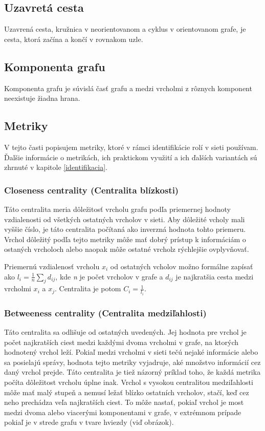 \documentclass[slovak,master,public,dept460,male,cpdeclaration,oneside]{diploma}
\begin{document}
\subsection{Uzavretá cesta}

Uzavrená cesta, kružnica v neorientovanom a cyklus v orientovanom grafe, je cesta, ktorá začína a končí v rovnakom uzle.

\subsection{Komponenta grafu}

Komponenta grafu je súvislá časť grafu a medzi vrcholmi z rôznych komponent neexistuje žiadna hrana.

\subsection{Metriky}
V tejto časti popisujem metriky, ktoré v rámci identifikácie rolí v sieti používam. Ďalšie informácie o metrikách, ich praktickom využití a ich ďalších variantách sú zhrnuté v kapitole \ref{identifikacia}.

\subsubsection{Closeness centrality (Centralita blízkosti)}
Táto centralita meria dôležitosť vrcholu grafu podľa priemernej hodnoty vzdialenosti od všetkých ostatných vrcholov v sieti. Aby dôležité vcholy mali vyššie číslo, je táto centralita počítaná ako inverzná hodnota tohto priemeru. Vrchol dôležitý podľa tejto metriky môže mať dobrý prístup k informáciám o ostaných vrcholoch alebo naopak môže ostatné vrcholz rýchlejšie ovplyvňovať.

Priemernú vzdialenosť vrcholu ${x_{i}}$ od ostatných vcholov možno formálne zapísať ako ${l_{i} = \frac{1}{n}\sum_{j}d_{ij}}$, kde \textit{n} je počet vrcholov v grafe a ${d_{ij}}$ je najkratšia cesta medzi vrcholmi  ${x_{i}}$ a  ${x_{j}}$. Centralita je potom  ${C_{i} = \frac{1}{l_{i}}}$.



\subsubsection{Betweeness centrality (Centralita medziľahlosti)}
Táto centralita sa odlišuje od ostatných uvedených. Jej hodnota pre vrchol je počet najkratších ciest medzi každými dvoma vrcholmi v grafe, na ktorých hodnotený vrchol leží. Pokiaľ medzi vrcholmi v sieti tečú nejaké informácie alebo sa posielajú správy, hodnota tejto metriky vyjadruje, aké množstvo informácií cez daný vrchol prejde. Táto centralita je tiež názorný príklad toho, že každá metrika počíta dôležitost vrcholu úplne inak. Vrchol s vysokou centralitou medziľahlosti môže mať malý stupeň a nemusí ležať blízko ostatních vrcholov, stačí, keď cez neho  prechádza veľa najkratších ciest. To môže nastať, pokiaľ vrchol je most medzi dvoma alebo viacerými komponentami v grafe, v extrémnom prípade pokiaľ je v strede grafu v tvare hviezdy (viď obrázok).
\end{document}

